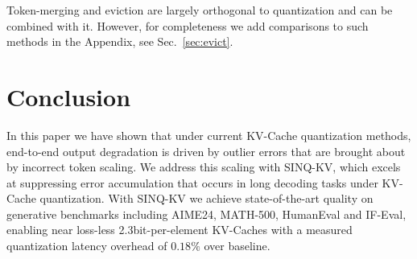 \documentclass{llmxive}
\providecommand{\methodname}{SINQ-KV\xspace}
\begin{document}
Token-merging and eviction are largely orthogonal to quantization and can be combined with it. However, for completeness we add comparisons to such methods in the Appendix, see Sec.~\ref{sec:evict}.


\section{Conclusion}
In this paper we have shown that under current KV-Cache quantization methods, end-to-end output degradation is driven by outlier errors that are brought about by incorrect token scaling. 
We address this scaling with \methodname, which excels at suppressing error accumulation that occurs in long decoding tasks under KV-Cache quantization.
With \methodname we achieve state-of-the-art quality on generative benchmarks including AIME24, MATH-500, HumanEval and IF-Eval, enabling near loss-less 2.3bit-per-element KV-Caches with a measured quantization latency overhead of $0.18\%$ over baseline.
\end{document}
